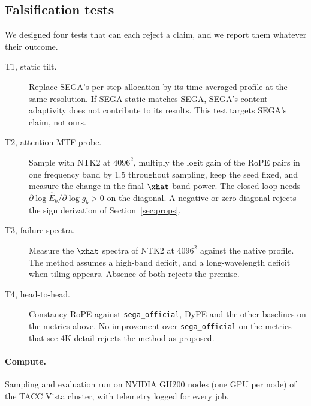 \subsection{Falsification tests}
\label{sec:killtests}
We designed four tests that can each reject a claim, and we report them whatever their outcome.
\begin{description}
  \item[T1, static tilt.] Replace SEGA's per-step allocation by its time-averaged profile at the same resolution. If SEGA-static matches SEGA, SEGA's content adaptivity does not contribute to its results. This test targets SEGA's claim, not ours. 
  \item[T2, attention MTF probe.] Sample with NTK2 at $4096^2$, multiply the logit gain of the RoPE pairs in one frequency band by 1.5 throughout sampling, keep the seed fixed, and measure the change in the final $\xhat$ band power. The closed loop needs $\partial\log\hat E_b/\partial\log g_b>0$ on the diagonal. A negative or zero diagonal rejects the sign derivation of Section~\ref{sec:props}.
  \item[T3, failure spectra.] Measure the $\xhat$ spectra of NTK2 at $4096^2$ against the native profile. The method assumes a high-band deficit, and a long-wavelength deficit when tiling appears. Absence of both rejects the premise.
  \item[T4, head-to-head.] Constancy RoPE against \texttt{sega\_official}, DyPE and the other baselines on the metrics above. No improvement over \texttt{sega\_official} on the metrics that see 4K detail rejects the method as proposed.
\end{description}

\paragraph{Compute.}
Sampling and evaluation run on NVIDIA GH200 nodes (one GPU per node) of the TACC Vista cluster, with telemetry logged for every job. 
